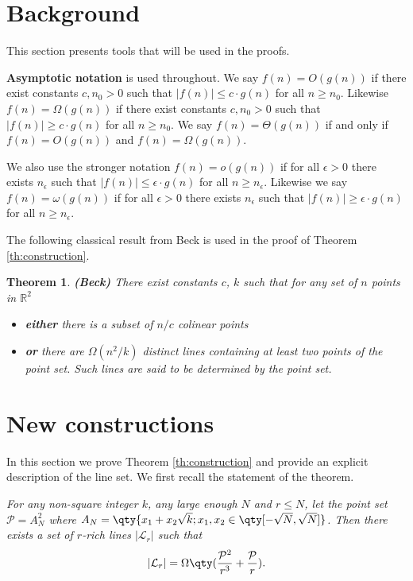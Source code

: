 \documentclass[11pt]{article}
\newtheorem{theorem}{Theorem}[section]
\newcommand{\RR}{\ensuremath{\mathbb R}}
\newcommand{\pts}{\mathcal P}
\newcommand{\lines}{\mathcal L}
\begin{document}
\section{Background}

This section presents tools that will be used in the proofs. 

\textbf{Asymptotic notation} is used throughout. We say $f(n) = O(g(n))$ if there exist constants $c, n_0 >0$ such that $|f(n)| \leq c \cdot g(n)$ for all $n \geq n_0$. Likewise $f(n) = \Omega(g(n))$ if there exist constants $c, n_0 >0$ such that $|f(n)| \geq c \cdot g(n)$ for all $n \geq n_0$. We say $f(n) = \Theta(g(n))$ if and only if $f(n) = O(g(n))$ and $f(n) = \Omega(g(n))$.

We also use the stronger notation $f(n) = o(g(n))$ if for all $\epsilon>0$ there exists $n_\epsilon$ such that $|f(n)| \leq \epsilon \cdot g(n)$ for all $n \geq n_\epsilon$. Likewise we say $f(n) = \omega(g(n))$ if for all $\epsilon>0$ there exists $n_\epsilon$ such that $|f(n)| \geq \epsilon \cdot g(n)$ for all $n \geq n_\epsilon$.

The following classical result from Beck \cite{Beck83} is used in the proof of Theorem \ref{th:construction}.

\begin{theorem} \label{th:Beck}{\bf (Beck)}
There exist constants $c$, $k$ such that for any set of $n$ points in $\RR^2$
\begin{itemize}
    \item \textbf{either} there is a subset of $n/c$ colinear points
    \item \textbf{or} there are $\Omega(n^2/k)$ distinct lines containing at least two points of the point set. Such lines are said to be \textit{determined} by the point set.
\end{itemize}

\end{theorem}

\section{New constructions} \label{sec:construction}

In this section we prove Theorem \ref{th:construction} and provide an explicit description of the line set. We first recall the statement of the theorem.
\vspace{2mm}

$\qquad$\\
\emph{For any non-square integer $k$, any large enough $N$ and $r \leq N$, let the point set $\pts=A_N^2$ where $A_N = \qty{ x_1 + x_2 \sqrt{k} ; x_1,x_2 \in \qty[-\sqrt{N},\sqrt{N}]}$. Then there exists a set of $r$-rich lines $|\lines_r|$ such that 
%
\[ |\lines_r| = \Omega \qty(\frac{\pts^2}{r^3} + \frac{\pts}{r}). \]
%
}
\end{document}
